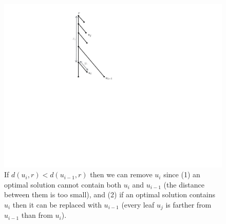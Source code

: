 \documentclass[a4paper,UKenglish]{lipics-v2016}
\theoremstyle{plain}
\begin{document}
\begin{figure}[ht]
\begin{center}
\includegraphics[scale=0.45]{caterpillar}
\end{center}
\caption{If $d(u_i,r)<d(u_{i-1},r)$ then  we can remove $u_{i}$ since (1) an optimal solution cannot contain both $u_{i}$ and $u_{i-1}$ (the distance between them is too small), and (2) if an optimal solution contains $u_{i}$ then it can be replaced with $u_{i-1}$ (every leaf $u_j$ is farther from $u_{i-1}$ than from $u_i$). \label{fig:pruning}}
\end{figure}
\end{document}
